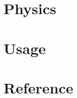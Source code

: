 \documentclass[a4paper,11pt,fleqn,draft]{report}\usepackage[draft]{graphicx}
\begin{document}
\flushbottom




\tableofcontents\cleardoublepage




\part{Physics}\label{PPHYS}







\part{Usage}\label{PUSE}


%
%

\part{Reference}\label{PREF}


\appendix %





\otherchapter{\nomname}\label{Snomencl}
\printnomenclature[6em]

\small
\printindex
\end{document}
